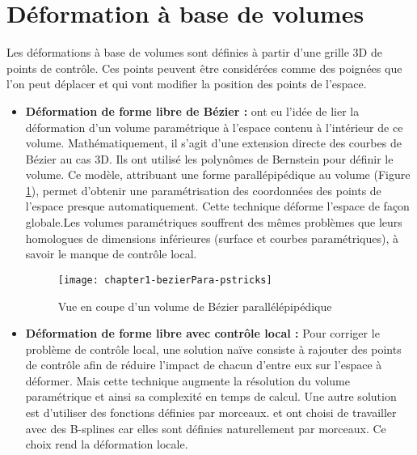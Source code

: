 \section{Déformation à base de volumes}

Les déformations à base de volumes sont définies à partir d'une grille 3D de
points de contrôle. Ces points peuvent être considérées comme des poignées que
l'on peut déplacer et qui vont modifier la position des points de l'espace.

\begin{itemize}

\item{\textbf{Déformation de forme libre de Bézier :}} \cite{SP86} ont eu
l'idée de lier la déformation d'un volume paramétrique à l'espace contenu à
l'intérieur de ce volume. Mathématiquement, il s'agit d'une extension directe
des courbes de Bézier au cas 3D. Ils ont utilisé les polynômes de Bernstein
pour définir le volume. Ce modèle, attribuant une forme parallépipédique au
volume (Figure \ref{SURPar}), permet d'obtenir une paramétrisation des
coordonnées des points de l'espace presque automatiquement. Cette technique
déforme l'espace de façon globale.Les volumes paramétriques souffrent des
mêmes problèmes que leurs homologues de dimensions inférieures (surface et
courbes paramétriques), à savoir le manque de contrôle local.

\begin{figure}[ht]
\begin{center}
  \texttt{[image: chapter1-bezierPara-pstricks]}
  \caption[Volume de Bézier parallélépipédique] {Vue en coupe d'un volume de
  Bézier parallélépipédique}
  \label{SURPar}
\end{center}
\end{figure}

\item{\textbf{Déformation de forme libre avec contrôle local :}} Pour corriger
le problème de contrôle local, une solution naïve consiste à rajouter des
points de contrôle afin de réduire l'impact de chacun d'entre eux sur l'espace
à déformer. Mais cette technique augmente la résolution du volume paramétrique
et ainsi sa complexité en temps de calcul. Une autre solution est d'utiliser
des fonctions définies par morceaux. \cite{GP89} et \cite{Com89} ont choisi de
travailler avec des B-splines car elles sont définies naturellement par
morceaux. Ce choix rend la déformation locale.


\end{itemize}
